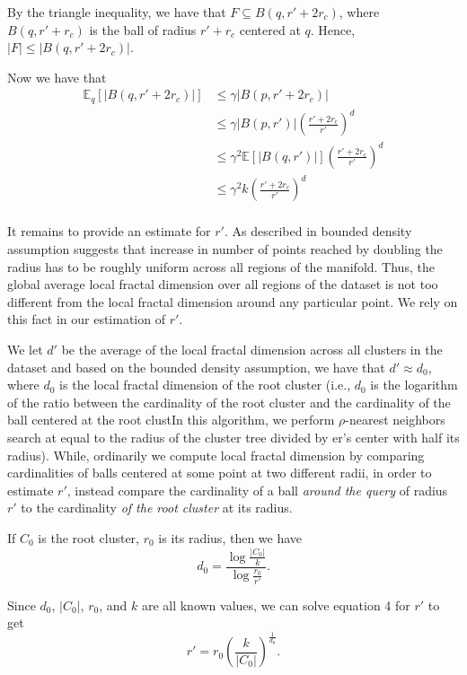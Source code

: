 By the triangle inequality, we have that $F \subseteq B(q, r' + 2r_c)$, 
where $B(q, r' + r_c)$ is the ball of radius $r' + r_c$ centered at $q$.
Hence, $|F| \leq |B(q, r' + 2r_c)|$.

Now we have that \begin{align*} \mathbb{E}_q[|B(q, r' + 2r_c)|] &\leq \gamma|B(p, r' + 2r_c)| \\ %
    &\leq \gamma|B(p, r')|\left(\frac{r' + 2r_c}{r'}\right)^d \label{5}\\ %
    &\leq \gamma^2 \mathbb{E}[|B(q, r')|]\left(\frac{r'+2r_c}{r'}\right)^d \\ %
    &\leq \gamma^2 k\left(\frac{r'+ 2r_c}{r'}\right)^d  \\   %
\end{align*}

It remains to provide an estimate for $r'$. As described in \cite{yu2015entropy} bounded density assumption suggests that increase in number of
points reached by doubling the radius has to be roughly uniform across all regions of the manifold. Thus, the global 
average local fractal dimension over all regions of the dataset is not too different from the local fractal dimension around any particular point.
We rely on this fact in our estimation of $r'$. 

We let $d'$ be the average of the local fractal dimension across all clusters in the dataset and based on the bounded density assumption, we have that
$d' \approx d_{0}$, where $d_0$ is the local fractal dimension of the root cluster (i.e., $d_0$ is the logarithm of the ratio between the cardinality of the root cluster 
and the cardinality of the ball centered at the root clustIn this algorithm, we perform $\rho$-nearest neighbors search at equal to the radius of the cluster tree divided by
er's center with half its radius). While, ordinarily we compute local fractal dimension 
by comparing cardinalities of balls centered at some point at two different radii, in order to estimate $r'$, instead compare the cardinality of 
a ball \emph{around the query} of radius $r'$ to the cardinality \emph{of the root cluster} at its radius.

If $C_0$ is the root cluster, $r_0$ is its radius, then we have 
\begin{equation} d_0 = \frac{\log{}\frac{|C_0|}{k}}{\log{}\frac{r_0}{r'}}. \label{4} \end{equation}

Since $d_0$, $|C_0|$, $r_0$, and $k$ are all known values, we can solve equation 4 for $r'$ to get
\begin{equation} r' = r_0\left(\frac{k}{|C_0|}\right)^{\frac{1}{d_0}}. \label{6} \end{equation}
